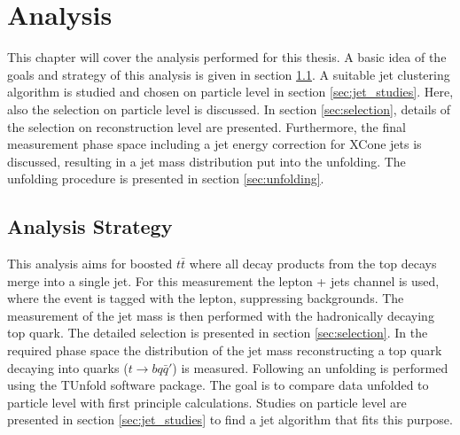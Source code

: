 \chapter{Analysis}
\label{ch:Ana}
	This chapter will cover the analysis performed for this thesis. A basic idea of the goals and strategy of this analysis is given in section \ref{sec:strategy}. A suitable jet clustering algorithm is studied and chosen on particle level in section \ref{sec:jet_studies}. Here, also the selection on particle level is discussed. In section \ref{sec:selection}, details of the selection on reconstruction level are presented. Furthermore, the final measurement phase space including a jet energy correction for XCone jets is discussed, resulting in a jet mass distribution put into the unfolding. The unfolding procedure is presented in section \ref{sec:unfolding}.
	
\section{Analysis Strategy}
\label{sec:strategy}
	This analysis aims for boosted $t\bar{t}$ where all decay products from the top decays merge into a single jet. For this measurement the lepton + jets channel is used, where the event is tagged with the lepton, suppressing backgrounds. The measurement of the jet mass is then performed with the hadronically decaying top quark. The detailed selection is presented in section \ref{sec:selection}. In the required phase space the distribution of the jet mass reconstructing a top quark decaying into quarks ($t\rightarrow b q \bar{q}'$) is measured. Following an unfolding is performed using the TUnfold \cite{tunfold} software package. The goal is to compare data unfolded to particle level with first principle calculations. Studies on particle level are presented in section \ref{sec:jet_studies} to find a jet algorithm that fits this purpose.
	

